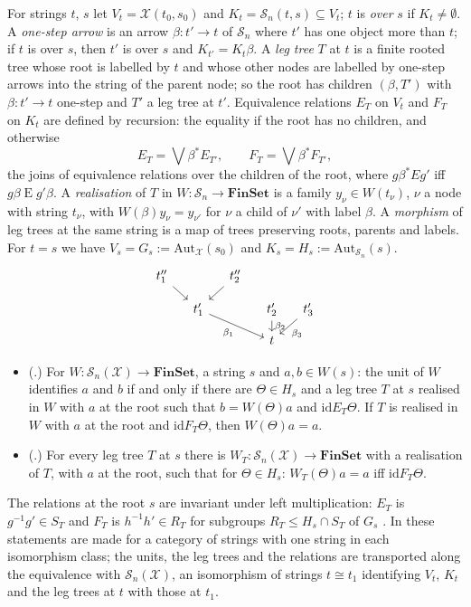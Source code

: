 \documentclass[11pt]{amsart}
\theoremstyle{definition}
\newcommand{\Fin}{\mathbf{FinSet}}
\newcommand{\Aut}{\mathrm{Aut}}
\newcommand{\cX}{\mathcal X}
\newcommand{\cS}{\mathcal S}
\newcommand{\id}{\mathrm{id}}
\begin{document}
For strings $t$, $s$ let $V_t=\cX(t_0,s_0)$ and $K_t=\cS_n(t,s)
\subseteq V_t$; $t$ is \emph{over} $s$ if $K_t\ne\emptyset$. A
\emph{one-step arrow} is an arrow $\beta\colon t'\to t$ of $\cS_n$
where $t'$ has one object more than $t$; if $t$ is over $s$, then $t'$
is over $s$ and $K_{t'}=K_t\beta$. A \emph{leg tree} $T$ at $t$
\cite[Def.~6.14]{Strings} is a finite rooted tree whose root is
labelled by $t$ and whose other nodes are labelled by one-step arrows
into the string of the parent node; so the root has children
$(\beta,T')$ with $\beta\colon t'\to t$ one-step and $T'$ a leg tree
at $t'$. Equivalence relations $E_T$ on $V_t$ and $F_T$ on $K_t$ are
defined by recursion: the equality if the root has no children, and
otherwise
\[
E_T=\bigvee\beta^*E_{T'},\qquad F_T=\bigvee\beta^*F_{T'},
\]
the joins of equivalence relations over the children of the root,
where $g\mathrel{\beta^*E}g'$ iff $g\beta\mathrel Eg'\beta$. A
\emph{realisation} of $T$ in $W\colon\cS_n\to\Fin$ is a family
$y_\nu\in W(t_\nu)$, $\nu$ a node with string $t_\nu$, with
$W(\beta)y_\nu=y_{\nu'}$ for $\nu$ a child of $\nu'$ with label
$\beta$. A \emph{morphism} of leg trees at the same string is a map of
trees preserving roots, parents and labels. For $t=s$ we have
$V_s=G_s:=\Aut_\cX(s_0)$ and $K_s=H_s:=\Aut_{\cS_n}(s)$.
\[
\begin{tikzcd}[column sep=small,row sep=small]
t''_1\ar[dr]&&t''_2\ar[dl]&&\\
&t'_1\ar[drr,"\beta_1"']&&t'_2\ar[d,"\beta_2"]&t'_3\ar[dl,"\beta_3"]\\
&&&t&
\end{tikzcd}
\]

\begin{itemize}
\item[(R6)] (\cite[proof of Thm.~6.15, (a), (b) and the Claim]{Strings}.)
For $W\colon\cS_n(\cX)\to\Fin$, a string $s$ and $a,b\in W(s)$: the
unit of $W$ identifies $a$ and $b$ if and only if there are $\Theta\in
H_s$ and a leg tree $T$ at $s$ realised in $W$ with $a$ at the root
such that $b=W(\Theta)a$ and $\id\mathrel{E_T}\Theta$. If $T$ is
realised in $W$ with $a$ at the root and $\id\mathrel{F_T}\Theta$,
then $W(\Theta)a=a$.
\item[(R7)] (\cite[proof of Thm.~6.15, (i)$\Rightarrow$(ii)]{Strings}.)
For every leg tree $T$ at $s$ there is $W_T\colon\cS_n(\cX)\to\Fin$
with a realisation of $T$, with $a$ at the root, such that for
$\Theta\in H_s$: $W_T(\Theta)a=a$ iff $\id\mathrel{F_T}\Theta$.
\end{itemize}
The relations at the root $s$ are invariant under left multiplication:
$E_T$ is $g^{-1}g'\in S_T$ and $F_T$ is $h^{-1}h'\in R_T$ for
subgroups $R_T\le H_s\cap S_T$ of $G_s$ \cite[\S6]{Strings}. In
\cite{Strings} these statements are made for a category of strings
with one string in each isomorphism class; the units, the leg trees
and the relations are transported along the equivalence with
$\cS_n(\cX)$, an isomorphism of strings $t\cong t_1$ identifying
$V_t$, $K_t$ and the leg trees at $t$ with those at $t_1$.
\end{document}

